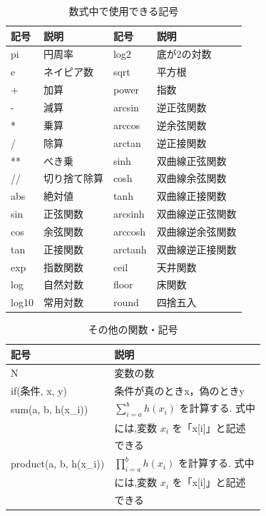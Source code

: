 \documentclass[a4paper, twocolumn]{ltjsarticle}
\begin{document}
\begin{table}[b]
    \centering
    \caption{数式中で使用できる記号}
    \begin{tabular}{ll|ll}
        \hline
        記号 & 説明 & 記号 & 説明  \\
        \hline
        pi & 円周率 & log2 & 底が2の対数\\
        e & ネイピア数 & sqrt & 平方根\\
        + & 加算 & power & 指数\\ 
        - & 減算 & arcsin & 逆正弦関数\\
        * & 乗算 & arccos & 逆余弦関数\\
        / & 除算 & arctan & 逆正接関数\\
        ** & べき乗 & sinh & 双曲線正弦関数\\
        // & 切り捨て除算 & cosh & 双曲線余弦関数\\
        abs & 絶対値 & tanh & 双曲線正接関数\\
        sin & 正弦関数& arcsinh & 双曲線逆正弦関数\\
        cos & 余弦関数 & arccosh & 双曲線逆余弦関数\\
        tan & 正接関数 & arctanh & 双曲線逆正接関数\\
        exp & 指数関数 & ceil & 天井関数\\
        log & 自然対数 & floor & 床関数\\
        log10 & 常用対数 & round & 四捨五入\\
        \hline
    \end{tabular}
\end{table}
\begin{table}[b]
    \centering
    \caption{その他の関数・記号}
    \begin{tabular}{ll} 
        \hline
        記号 & 説明 \\
        \hline
        N                       & 変数の数\\      
        if(条件, x, y)          & 条件が真のときx，偽のときy \\
        sum(a, b, h(x\_i))      & $\sum_{i=a}^{b}h(x_i)$ を計算する. 式中\\
                                & には,変数 $x_i$ を「x[i]」と記述\\
                                & できる \\
        product(a, b, h(x\_i))  & $\prod_{i=a}^{b}h(x_i)$ を計算する. 式中\\
                                & には,変数 $x_i$ を「x[i]」と記述\\
                                & できる \\
        \hline
    \end{tabular}
\end{table}
\end{document}
